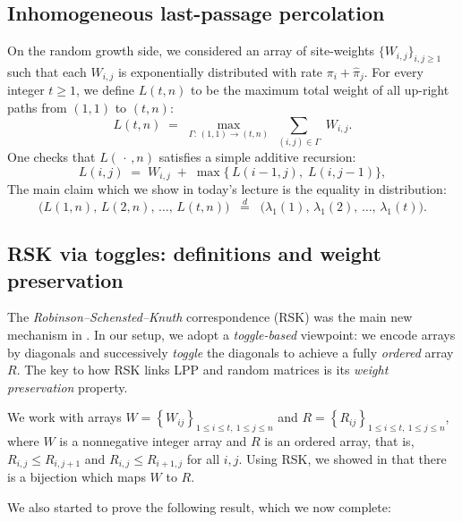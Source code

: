 \documentclass[letterpaper,11pt,oneside,reqno]{book}
\numberwithin{equation}{chapter}  %
\theoremstyle{definition}
\begin{document}
\subsection{Inhomogeneous last-passage percolation}

On the random growth side, we considered an array of
site-weights $\{W_{i,j}\}_{i,j\ge1}$ such that each
$W_{i,j}$ is exponentially distributed with rate $\pi_i +
\hat\pi_j$.  For every integer $t\ge1$, we define $L(t,n)$
to be the maximum total weight of all up-right paths from
$(1,1)$ to $(t,n)$:
\[
L(t,n)\;=\;\max_{\Gamma:\,(1,1)\to(t,n)} \;\sum_{(i,j)\in\Gamma}\; W_{i,j}.
\]
One checks that $L(\,\cdot\,,n)$ satisfies a simple additive recursion:
\[
L(i,j)
\;=\;
W_{i,j}\;+\;\max\bigl\{\,L(i-1,j),\;L(i,j-1)\bigr\},
\]
The main claim which we show in today's lecture is the equality in distribution:
\begin{equation}
	\label{lecture14:eq:main-claim}
\bigl(L(1,n),\,L(2,n),\,\dots,\,L(t,n)\bigr)
\;\;\stackrel{d}{=}\;\;
\bigl(\lambda_1(1),\,\lambda_1(2),\,\dots,\,\lambda_1(t)\bigr).
\end{equation}

\subsection{RSK via toggles: definitions and weight preservation}

The \emph{Robinson--Schensted--Knuth} correspondence (RSK) was the main new mechanism in
.
In our setup, we adopt a \emph{toggle-based} viewpoint: we
encode arrays by diagonals and successively \emph{toggle}
the diagonals to achieve a fully \emph{ordered} array $R$.
The key to how RSK links LPP and random matrices is its \emph{weight preservation} property.

We work with arrays $W=\left\{ W_{ij} \right\}_{1\le i\le t,\ 1\le j\le n}$
and $R=\left\{ R_{ij} \right\}_{1\le i\le t,\ 1\le j\le n}$,
where $W$ is a nonnegative integer array and $R$ is an ordered array, that is,
$R_{i,j}\le R_{i,j+1}$ and $R_{i,j}\le R_{i+1,j}$ for all $i,j$. Using RSK,
we showed in  that
there is a bijection which maps $W$ to $R$.

We also started to prove the following result, which we now complete:
\end{document}
